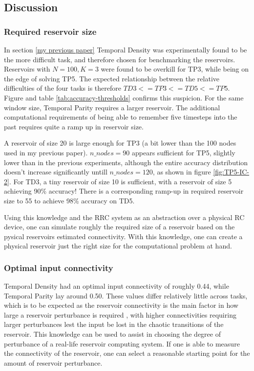 \subsection{Discussion}

\subsubsection{Required reservoir size}

In section \ref{my previous paper} Temporal Density was experimentally found to be the more difficult task, and therefore chosen for benchmarking the reservoirs.
Reservoirs with $N=100, K=3$ were found to be overkill for TP3, while being on the edge of solving TP5.
The expected relationship between the relative difficulties of the four tasks is therefore $ TD3 <= TP3 <= TD5 <= TP5 $.
Figure \label{fig:threshold-TP3} and table \ref{tab:accuracy-thresholds} confirms this suspicion.
For the same window size, Temporal Parity requires a larger reservoir.
The additional computational requirements of being able to remember five timesteps into the past requires quite a ramp up in reservoir size.

A reservoir of size 20 is large enough for TP3 (a bit lower than the 100 nodes used in my previous paper).
$ n\_nodes = 90 $ appears sufficient for TP5, slightly lower than in the previous experiments,
although the entire accuracy distribution doesn't increase significantly untill $ n\_nodes = 120 $, as shown in figure \ref{fig:TP5-IC-2}.
For TD3, a tiny reservoir of size 10 is sufficient, with a reservoir of size 5 achieving 90\% accuracy!
There is a corresponding ramp-up in required reservoir size to 55 to achieve 98\% accuracy on TD5.

Using this knowledge and the RRC system as an abstraction over a physical RC device,
one can simulate roughly the required size of a reservoir based on the pysical reservoirs estimated connectivity.
With this knowledge, one can create a physical reservoir just the right size for the computational problem at hand.

\subsubsection{Optimal input connectivity}

Temporal Density had an optimal input connectivity of roughly 0.44, while Temporal Parity lay around 0.50.
These values differ relatively little across tasks,
which is to be expected as the reservoir connectivity is the main factor in how large a reservoir perturbance is required ,
with higher connectivities requiring larger perturbances lest the input be lost in the chaotic transitions of the reservoir.
This knowledge can be used to assist in choosing the degree of perturbance of a real-life reservoir computing system.
If one is able to measure the connectivity of the reservoir,
one can select a reasonable starting point for the amount of reservoir perturbance.
